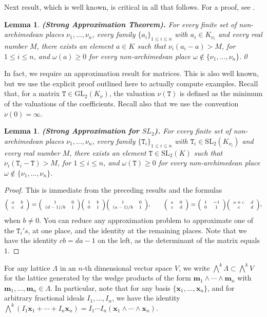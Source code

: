 \documentclass{article}
\newtheorem{Lem}[Prop]{Lemma}
\theoremstyle{definition}
\theoremstyle{remark}
\newcommand\sbmattrix[4]{\textnormal{\scriptsize$\left(\begin{array}{cc}#1&#2\\#3&#4\end{array}\right)$\normalsize}}
\begin{document}
Next result, which is well known, is critical in all that follows. 
For a proof, see \cite[\S21:3]{O73}.

\begin{Lem}\label{lap1}
\textbf{(Strong Approximation Theorem).}
For every finite set of non-archimedean places $\nu_1,\dots,\nu_n$,
every family $\{a_i\}_{1\leq i\leq n}$ with $a_i\in K_{\nu_i}$ and
every real number $M$, there exists an element
$a\in K$ such that $\nu_i(a_i-a)>M$, for $1\leq i\leq n$,
and $\omega(a)\geq0$ for every non-archimedean place
$\omega\notin \{\nu_1,\dots,\nu_n\}$.\qed
\end{Lem}

In fact, we require an approximation result for matrices.
This is also well known, but we use the explicit proof outlined 
here  to actually compute examples.
Recall that, for a matrix $\mathtt{T}\in\mathrm{GL}_2(K_{\nu})$, 
the valuation  $\nu(\mathtt{T})$ is defined as the minimum of the 
valuations of the coefficients.
Recall also that we use the convention $\nu(0)=\infty$.

\begin{Lem}\label{lap2}
\textbf{(Strong Approximation for $SL_2$).}
For every finite set of non-archimedean places $\nu_1,\dots,\nu_n$,
every family $\{\mathtt{T}_i\}_{1\leq i\leq n}$ with 
$\mathtt{T}_i\in \mathrm{SL}_2(K_{\nu_i})$ and
every real number $M$, there exists an element
$\mathtt{T}\in \mathrm{SL}_2(K)$ such that 
$\nu_i(\mathtt{T}_i-\mathtt{T})>M$, for $1\leq i\leq n$,
and $\omega(\mathtt{T})\geq0$ 
for every non-archimedean place
$\omega\notin \{\nu_1,\dots,\nu_n\}$.
\end{Lem}

\begin{proof}
This is immediate from the preceding results and the formulas
\begin{equation}\label{mat1}
\sbmattrix abcd=\sbmattrix10{(d-1)/b}1
\sbmattrix1b01
\sbmattrix10{(a-1)/b}1,
\qquad
\sbmattrix a0cd=\sbmattrix1{-1}01\sbmattrix {a+c}dcd,
\end{equation}
when $b\neq 0$. You can reduce any approximation problem 
to approximate one of the $\mathtt{T}_i's$, at one place,
and the identity at  the remaining places.
Note that we have the identity $cb=da-1$ on the left, 
as the determinant of the matrix equals $1$.
\end{proof}

  For any lattice $\Lambda$ in an $n$-th dimensional vector space $V$,
  we write $\bigwedge^k\!\! \Lambda\subset\bigwedge^k\!\! V$
  for the lattice generated by the wedge products of the form
  $\mathbf{m}_1\wedge\cdots\wedge \mathbf{m}_n$ with
  $\mathbf{m}_1,\dots,\mathbf{m}_n\in\Lambda$.
  In particular, note that for any basis 
  $\{\mathbf{x}_1,\dots,\mathbf{x}_n\}$, and for arbitrary
  fractional ideals $I_1,\dots, I_n$,
  we have the identity $\bigwedge^k\!
  (I_1\mathbf{x}_1+\cdots+I_n\mathbf{x}_n)=
  I_1\cdots I_n(\mathbf{x}_1\wedge\cdots\wedge \mathbf{x}_n)$.
\end{document}

